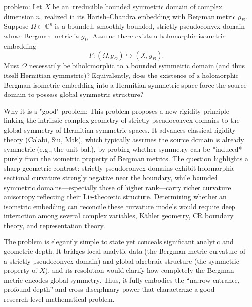 problem:  
Let \( X \) be an irreducible bounded symmetric domain of complex dimension \( n \), realized in its Harish–Chandra embedding with Bergman metric \( g_B \). Suppose \( \Omega \subset \mathbb{C}^n \) is a bounded, smoothly bounded, strictly pseudoconvex domain whose Bergman metric is \( g_\Omega \). Assume there exists a holomorphic isometric embedding  
\[
F : (\Omega, g_\Omega) \hookrightarrow (X, g_B).
\]  
Must \( \Omega \) necessarily be biholomorphic to a bounded symmetric domain (and thus itself Hermitian symmetric)?  
Equivalently, does the existence of a holomorphic Bergman isometric embedding into a Hermitian symmetric space force the source domain to possess global symmetric structure?

Why it is a "good" problem:  
This problem proposes a new rigidity principle linking the intrinsic complex geometry of strictly pseudoconvex domains to the global symmetry of Hermitian symmetric spaces. It advances classical rigidity theory (Calabi, Siu, Mok), which typically assumes the source domain is already symmetric (e.g., the unit ball), by probing whether symmetry can be *induced* purely from the isometric property of Bergman metrics. The question highlights a sharp geometric contrast: strictly pseudoconvex domains exhibit holomorphic sectional curvature strongly negative near the boundary, while bounded symmetric domains—especially those of higher rank—carry richer curvature anisotropy reflecting their Lie-theoretic structure. Determining whether an isometric embedding can reconcile these curvature models would require deep interaction among several complex variables, Kähler geometry, CR boundary theory, and representation theory.  

The problem is elegantly simple to state yet conceals significant analytic and geometric depth. It bridges local analytic data (the Bergman metric curvature of a strictly pseudoconvex domain) and global algebraic structure (the symmetric property of \( X \)), and its resolution would clarify how completely the Bergman metric encodes global symmetry. Thus, it fully embodies the “narrow entrance, profound depth” and cross‑disciplinary power that characterize a good research‑level mathematical problem.
